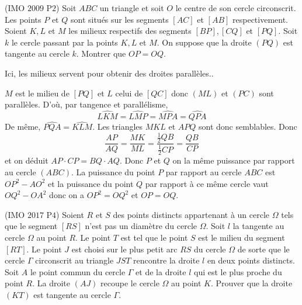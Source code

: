 \begin{exo}
(IMO $2009$ P$2$)
Soit $ABC$ un triangle et soit $O$ le centre de son cercle circonscrit. Les points $P$ et $Q$ sont situés sur les segments $[AC]$ et $[AB]$ respectivement. Soient $K,L$ et $M$ les milieux respectifs des segments $[BP],[CQ]$ et $[PQ]$. Soit $k$ le cercle passant par la points $K,L$ et $M$. On suppose que la droite $(PQ)$ est tangente au cercle $k$. Montrer que $OP=OQ$.
\end{exo}


\begin{sol}
Ici, les milieux servent pour obtenir des droites parallèles..

$M$ est le milieu de $[PQ]$ et $L$ celui de $[QC]$ donc $(ML)$ et $(PC)$ sont parallèles. D'où, par tangence et parallélisme,
$$\widehat{LKM}=\widehat{LMP}=\widehat{MPA}=\widehat{QPA}$$
De même, $\widehat{PQA}=\widehat{KLM}$. Les triangles $MKL$ et $APQ$ sont donc semblables. Donc
$$\frac{AP}{AQ}=\frac{MK}{ML}=\frac{\frac{1}{2}QB}{\frac{1}{2}CP}=\frac{QB}{CP}$$
et on déduit $AP\cdot CP=BQ\cdot AQ$. Donc $P$ et $Q$ on la même puissance par rapport au cercle $(ABC)$. La puissance du point $P$ par rapport au cercle $ABC$ est $OP^2-AO^2$ et la puissance du point $Q$ par rapport à ce même cercle vaut $OQ^2-OA^2$ donc on a $OP^2=OQ^2$ et $OP=OQ$.
\end{sol}


\begin{exo}
(IMO $2017$ P$4$)
Soient $R$ et $S$ des points distincts appartenant à un cercle $\Omega$ tels que le segment $[RS]$ n'est pas un diamètre du cercle $\Omega$. Soit $l$ la tangente au cercle $\Omega$ au point $R$. Le point $T$ est tel que le point $S$ est le milieu du segment $[RT]$. Le point $J$ est choisi sur le plus petit arc $RS$ du cercle $\Omega$ de sorte que le cercle $\Gamma$ circonscrit au triangle $JST$ rencontre la droite $l$ en deux points distincts. Soit $A$ le point commun du cercle $\Gamma$ et de la droite $l$ qui est le plus proche du point $R$. La droite $(AJ)$ recoupe le cercle $\Omega$ au point $K$. Prouver que la droite $(KT)$ est tangente au cercle $\Gamma$.
\end{exo}


